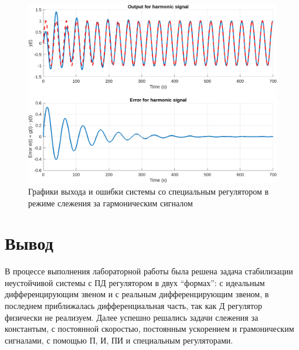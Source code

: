 \begin{figure}[H]
    \centering
    \includegraphics[width=1\textwidth]{figs/task_6_out_harmonic.png}
    \caption{Графики выхода и ошибки системы со специальным регулятором в режиме слежения за гармоническим сигналом}
    \label{fig:task_6_out}
\end{figure}



\section{Вывод}

В процессе выполнения лабораторной работы была решена задача стабилизации
неустойчивой системы с ПД регулятором в двух ``формах'': с идеальным дифференцирующим звеном
и с реальным дифференцирующим звеном, в последнем приближалась дифференциальная часть,
так как Д регулятор физически не реализуем. Далее успешно решались задачи слежения 
за константым, с постоянной скоростью, постоянным ускорением и грамоническим сигналами,
с помощью П, И, ПИ и специальным регуляторами. 



